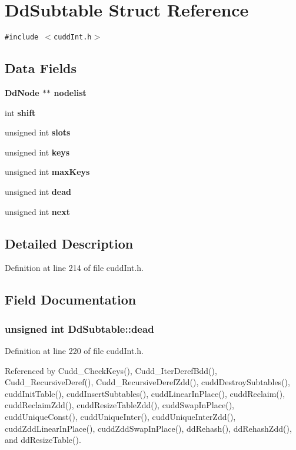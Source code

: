\section{Dd\-Subtable Struct Reference}
\label{structDdSubtable}
{\tt \#include $<$cudd\-Int.h$>$}

\subsection*{Data Fields}
\begin{CompactItemize}
\item 
\bf{Dd\-Node} $\ast$$\ast$ \bf{nodelist}
\item 
int \bf{shift}
\item 
unsigned int \bf{slots}
\item 
unsigned int \bf{keys}
\item 
unsigned int \bf{max\-Keys}
\item 
unsigned int \bf{dead}
\item 
unsigned int \bf{next}
\end{CompactItemize}


\subsection{Detailed Description}




Definition at line 214 of file cudd\-Int.h.

\subsection{Field Documentation}
\subsubsection{\setlength{\rightskip}{0pt plus 5cm}unsigned int \bf{Dd\-Subtable::dead}}\label{structDdSubtable_5f391dd3334a05f5e753d7df4da807bc}




Definition at line 220 of file cudd\-Int.h.

Referenced by Cudd\_\-Check\-Keys(), Cudd\_\-Iter\-Deref\-Bdd(), Cudd\_\-Recursive\-Deref(), Cudd\_\-Recursive\-Deref\-Zdd(), cudd\-Destroy\-Subtables(), cudd\-Init\-Table(), cudd\-Insert\-Subtables(), cudd\-Linear\-In\-Place(), cudd\-Reclaim(), cudd\-Reclaim\-Zdd(), cudd\-Resize\-Table\-Zdd(), cudd\-Swap\-In\-Place(), cudd\-Unique\-Const(), cudd\-Unique\-Inter(), cudd\-Unique\-Inter\-Zdd(), cudd\-Zdd\-Linear\-In\-Place(), cudd\-Zdd\-Swap\-In\-Place(), dd\-Rehash(), dd\-Rehash\-Zdd(), and dd\-Resize\-Table().

